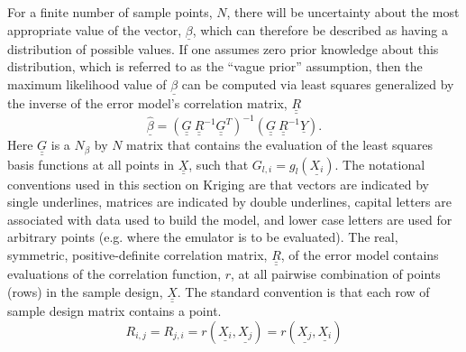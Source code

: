\documentclass{article}
\begin{document}
For a finite number of sample points, $N$, there will be uncertainty
about the most appropriate value of the vector, $\underline{\beta}$, 
which can therefore be described as having a distribution of possible
values.  If one assumes zero prior knowledge about this distribution, 
which is referred to as the ``vague prior'' assumption, then the maximum
likelihood value of $\underline{\beta}$ can be computed via least 
squares generalized by the inverse of the error model's correlation 
matrix, $\underline{\underline{R}}$ 
\begin{displaymath}
\underline{\hat{\beta}}=\left(\underline{\underline{G}}\ \underline{\underline{R}}^{-1}\underline{\underline{G}}^T\right)^{-1}\left(\underline{\underline{G}}\ \underline{\underline{R}}^{-1}\underline{Y}\right).
\end{displaymath}
Here $\underline{\underline{G}}$ is a $N_\beta$ by $N$ matrix that 
contains the evaluation of the least 
squares basis functions at all points in $\underline{\underline{X}}$, 
such that $G_{l,i}=g_l\left(\underline{X_i}\right)$.  
The notational conventions used in this section on Kriging are that vectors
are indicated by single underlines, matrices are indicated by double underlines,
capital letters are associated with data used to build the model, and lower 
case letters are used for arbitrary points (e.g. where the emulator
is to be evaluated).  The real, symmetric, positive-definite correlation 
matrix, $\underline{\underline{R}}$, of the error model contains evaluations 
of the correlation function, $r$, at all pairwise combination of points 
(rows) in the sample design, $\underline{\underline{X}}$.  The standard 
convention is that each row of sample design matrix contains a point.
\begin{displaymath}
R_{i,j}=R_{j,i}=r\left(\underline{X_i},\underline{X_j}\right)=r\left(\underline{X_j},\underline{X_i}\right)
\end{displaymath}
\end{document}
